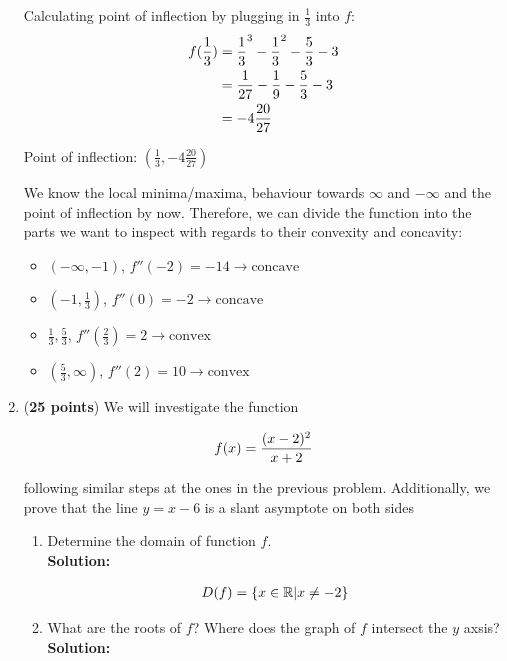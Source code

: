 \documentclass[a4paper]{article}
\begin{document}
\begin{enumerate}
Calculating point of inflection by plugging in $\frac{1}{3}$ into $f$:\\

\begin{align*}
f(\frac{1}{3}) &= \frac{1}{3}^3 - \frac{1}{3}^2 - \frac{5}{3} - 3\notag\\
 &= \frac{1}{27} - \frac{1}{9} - \frac{5}{3} - 3\notag\\
 &= -4\frac{20}{27}
\end{align*}

Point of inflection: $\left( \frac{1}{3}, -4\frac{20}{27} \right)$

We know the local minima/maxima, behaviour towards $\infty$ and $-\infty$ and the point of inflection by now. Therefore, we can divide the function into the parts we want to inspect with regards to their convexity and concavity:

\begin{itemize}
	\item $(- \infty, -1)$, $f''(-2) = -14 \rightarrow \text{concave}$
	\item $(-1, \frac{1}{3})$, $f''(0) = -2 \rightarrow \text{concave}$
	\item $\frac{1}{3},\frac{5}{3}$, $f''(\frac{2}{3}) = 2 \rightarrow \text{convex}$
	\item $(\frac{5}{3}, \infty)$, $f''(2) = 10 \rightarrow \text{convex}$
\end{itemize}



\item (\textbf{25 points}) We will investigate the function

\begin{align}
	f(x) = \frac{(x-2)^2}{x+2}\notag
\end{align}

following similar steps at the ones in the previous problem. Additionally, we prove that the line $y = x - 6$ is a slant asymptote on both sides

\begin{enumerate}
	\item Determine the domain of function $f$.\\
	\textbf{Solution:}
		
\begin{align}
	D(f) = \{ x \in \mathbb{R} | x \neq -2 \}\notag
\end{align}
\vspace{1em}		
		
		
	\item What are the roots of $f$? Where does the graph of $f$ intersect the $y$ axsis?\\
	\textbf{Solution:}\\
	

\end{enumerate}
\end{enumerate}
\end{document}
